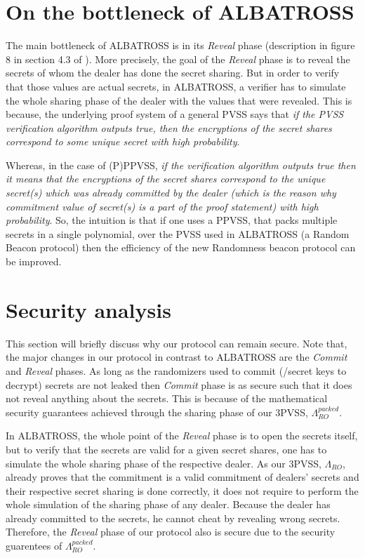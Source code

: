 \section{On the bottleneck of ALBATROSS}
The main bottleneck of ALBATROSS is in its \textit{Reveal} phase (description in 
figure 8 in section 4.3 of \cite{cryptoeprint:2020/644}). More precisely, the 
goal of the \textit{Reveal} phase is to reveal the secrets of whom the dealer has done the 
secret sharing. But in order to verify that those values are actual secrets, in ALBATROSS, a 
verifier has to simulate the whole sharing phase of the dealer with the values that were 
revealed. This is because, the underlying proof system of a general PVSS says that \textit{if the 
PVSS verification algorithm outputs true, then the encryptions of the secret shares correspond 
to some unique secret with high probability}.\par

Whereas, in the case of (P)PPVSS, \textit{if the verification algorithm outputs true then it means 
that the encryptions of the secret shares correspond to the unique secret(s) which was 
already committed by the dealer (which is the reason why commitment value of secret(s) 
is a part of the proof statement) with high probability}. So, the intuition is that if one 
uses a PPVSS, that packs multiple secrets in a single polynomial, over the PVSS used in 
ALBATROSS (a Random Beacon protocol) then the efficiency of the new Randomness beacon 
protocol can be improved.

\section{Security analysis}
This section will briefly discuss why our protocol can remain secure. Note that, the major changes 
in our protocol in contrast to ALBATROSS are the \textit{Commit} and \textit{Reveal} 
phases. As long as the randomizers used to commit (/secret keys to decrypt) secrets are 
not leaked then \textit{Commit} phase is as secure such that it does not reveal anything 
about the secrets. This is because of the mathematical security guarantees achieved 
through the sharing phase of our 3PVSS, $\Lambda_{RO}^{packed}$.\par

In ALBATROSS, the whole point of the \textit{Reveal} phase is to open the secrets itself, 
but to verify that the secrets are valid for a given secret shares, one has to simulate 
the whole sharing phase of the respective dealer. As our 3PVSS, $\Lambda_{RO}$, already 
proves that the commitment is a valid commitment of dealers' secrets and their respective 
secret sharing is done correctly, it does not require to perform the whole simulation of 
the sharing phase of any dealer. Because the dealer has already committed to the 
secrets, he cannot cheat by revealing wrong secrets. Therefore, the \textit{Reveal} 
phase of our protocol also is secure due to the security guarentees of $\Lambda_{RO}^{packed}$.

